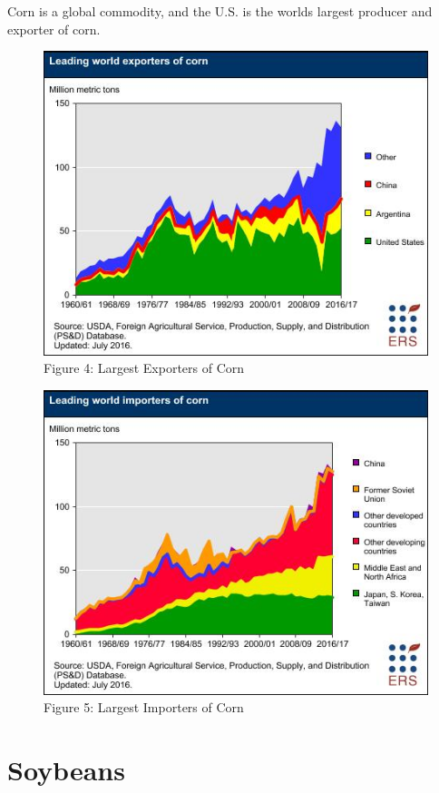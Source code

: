 \documentclass[]{book}
\theoremstyle{definition}
\theoremstyle{definition}
\theoremstyle{remark}
\begin{document}
Corn is a global commodity, and the U.S. is the worlds largest producer
and exporter of corn.

\begin{figure}[htbp]
\centering
\includegraphics{images/Corn-World-Exporters.png}
\caption{Figure 4: Largest Exporters of Corn}
\end{figure}

\begin{figure}[htbp]
\centering
\includegraphics{images/Corn-World-Importers.png}
\caption{Figure 5: Largest Importers of Corn}
\end{figure}

\section{Soybeans}\label{soybeans}
\end{document}
